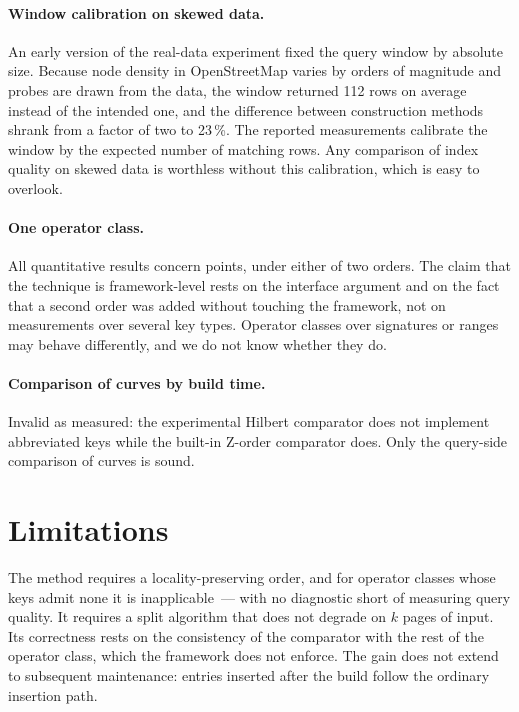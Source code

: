 \paragraph{Window calibration on skewed data.} An early version of the real-data
experiment fixed the query window by absolute size. Because node density in
OpenStreetMap varies by orders of magnitude and probes are drawn from the data,
the window returned 112 rows on average instead of the intended one, and the
difference between construction methods shrank from a factor of two to 23\,\%.
The reported measurements calibrate the window by the expected number of
matching rows. Any comparison of index quality on skewed data is worthless
without this calibration, which is easy to overlook.

\paragraph{One operator class.} All quantitative results concern points, under
either of two orders. The claim that the technique is framework-level rests on
the interface argument and on the fact that a second order was added without
touching the framework, not on measurements over several key types. Operator
classes over signatures or ranges may behave differently, and we do not know
whether they do.

\paragraph{Comparison of curves by build time.} Invalid as measured: the
experimental Hilbert comparator does not implement abbreviated keys while the
built-in Z-order comparator does. Only the query-side comparison of curves is
sound.

\section{Limitations}

The method requires a locality-preserving order, and for operator classes whose
keys admit none it is inapplicable~--- with no diagnostic short of measuring
query quality. It requires a split algorithm that does not degrade on $k$ pages
of input. Its correctness rests on the consistency of the comparator with the
rest of the operator class, which the framework does not enforce. The gain does
not extend to subsequent maintenance: entries inserted after the build follow the
ordinary insertion path.

